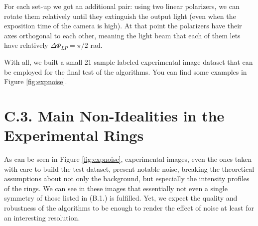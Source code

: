 \documentclass[11pt, a4paper, twoside]{article} %
\begin{document}
For each set-up we got an additional pair: using two linear polarizers, we can rotate them relatively until they extinguish the output light (even when the exposition time of the camera is high). At that point the polarizers have their axes orthogonal to each other, meaning the light beam that each of them lets have relatively $\Delta \Phi_{LP}=\pi/2$ rad.

With all, we built a small 21 sample labeled experimental image dataset that can be employed for the final test of the algorithms. You can find some examples in Figure \ref{fig:expnoise}.


\section*{C.3. Main Non-Idealities in the Experimental Rings}
As can be seen in Figure \ref{fig:expnoise}, experimental images, even the ones taken with care to build the test dataset, present notable noise, breaking the theoretical assumptions about not only the background, but especially the  intensity profiles of the rings. We can see in these images that essentially not even a single symmetry of those listed in (B.1.) is fulfilled. Yet, we expect the quality and robustness of the algorithms to be enough to render the effect of noise at least for an interesting resolution.
\end{document}
